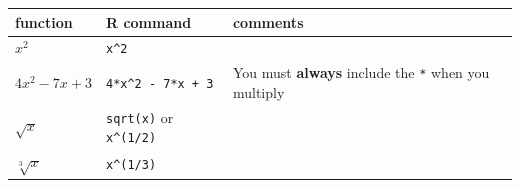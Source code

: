 \documentclass[
]{book}
\begin{document}
\begin{longtable}[]{@{}lll@{}}
\toprule
\begin{minipage}[b]{0.30\columnwidth}\raggedright
function\strut
\end{minipage} & \begin{minipage}[b]{0.30\columnwidth}\raggedright
R command\strut
\end{minipage} & \begin{minipage}[b]{0.30\columnwidth}\raggedright
comments\strut
\end{minipage}\tabularnewline
\midrule
\endhead
\begin{minipage}[t]{0.30\columnwidth}\raggedright
\(x^2\)\strut
\end{minipage} & \begin{minipage}[t]{0.30\columnwidth}\raggedright
\texttt{x\^{}2}\strut
\end{minipage} & \begin{minipage}[t]{0.30\columnwidth}\raggedright
\strut
\end{minipage}\tabularnewline
\begin{minipage}[t]{0.30\columnwidth}\raggedright
\(4x^2 -7x + 3\)\strut
\end{minipage} & \begin{minipage}[t]{0.30\columnwidth}\raggedright
\texttt{4*x\^{}2\ -\ 7*x\ +\ 3}\strut
\end{minipage} & \begin{minipage}[t]{0.30\columnwidth}\raggedright
You must \textbf{always} include the \texttt{*} when you multiply\strut
\end{minipage}\tabularnewline
\begin{minipage}[t]{0.30\columnwidth}\raggedright
\(\sqrt{x}\)\strut
\end{minipage} & \begin{minipage}[t]{0.30\columnwidth}\raggedright
\texttt{sqrt(x)} or \texttt{x\^{}(1/2)}\strut
\end{minipage} & \begin{minipage}[t]{0.30\columnwidth}\raggedright
\strut
\end{minipage}\tabularnewline
\begin{minipage}[t]{0.30\columnwidth}\raggedright
\(\sqrt[3]{x}\)\strut
\end{minipage} & \begin{minipage}[t]{0.30\columnwidth}\raggedright
\texttt{x\^{}(1/3)}\strut
\end{minipage} & \begin{minipage}[t]{0.30\columnwidth}\raggedright

\end{minipage}
\end{longtable}
\end{document}
